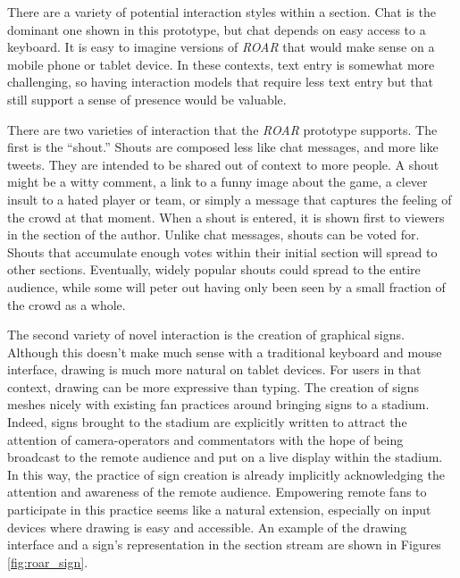 There are a variety of potential interaction styles within a section. Chat is the dominant one shown in this prototype, but chat depends on easy access to a keyboard. It is easy to imagine versions of \emph{ROAR} that would make sense on a mobile phone or tablet device. In these contexts, text entry is somewhat more challenging, so having interaction models that require less text entry but that still support a sense of presence would be valuable.

There are two varieties of interaction that the \emph{ROAR} prototype supports. The first is the ``shout.'' Shouts are composed less like chat messages, and more like tweets. They are intended to be shared out of context to more people. A shout might be a witty comment, a link to a funny image about the game, a clever insult to a hated player or team, or simply a message that captures the feeling of the crowd at that moment. When a shout is entered, it is shown first to viewers in the section of the author. Unlike chat messages, shouts can be voted for. Shouts that accumulate enough votes within their initial section will spread to other sections.  Eventually, widely popular shouts could spread to the entire audience, while some will peter out having only been seen by a small fraction of the crowd as a whole.

The second variety of novel interaction is the creation of graphical signs. Although this doesn't make much sense with a traditional keyboard and mouse interface, drawing is much more natural on tablet devices. For users in that context, drawing can be more expressive than typing. The creation of signs meshes nicely with existing fan practices around bringing signs to a stadium. Indeed, signs brought to the stadium are explicitly written to attract the attention of camera-operators and commentators with the hope of being broadcast to the remote audience and put on a live display within the stadium. In this way, the practice of sign creation is already implicitly acknowledging the attention and awareness of the remote audience. Empowering remote fans to participate in this practice seems like a natural extension, especially on input devices where drawing is easy and accessible. An example of the drawing interface and a sign's representation in the section stream are shown in Figures \ref{fig:roar_sign}.

